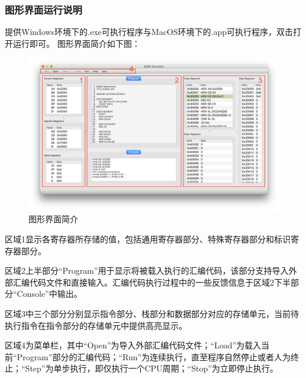 \documentclass[UTF8,12pt]{article}
\begin{document}
	    \subsubsection{图形界面运行说明}
	    提供Windows环境下的.exe可执行程序与MacOS环境下的.app可执行程序，双击打开运行即可。
	    图形界面简介如下图：\\
	    \begin{figure}[H]
    	    \centering
    	    \includegraphics[width=15cm]{fig/ui.png}
    	    \caption{图形界面简介}
    	    \label{图形界面简介}
	    \end{figure}
	    区域1显示各寄存器所存储的值，包括通用寄存器部分、特殊寄存器部分和标识寄存器部分。
	    
	    区域2上半部分“Program”用于显示将被载入执行的汇编代码，该部分支持导入外部汇编代码文件和直接输入。汇编代码执行过程中的一些反馈信息于区域2下半部分“Console”中输出。
	    
	    区域3中三个部分分别显示指令部分、栈部分和数据部分对应的存储单元，当前待执行指令在指令部分的存储单元中提供高亮显示。
	    
	    区域4为菜单栏，其中“Open”为导入外部汇编代码文件；“Load”为载入当前“Program”部分的汇编代码；“Run”为连续执行，直至程序自然停止或者人为终止；“Step”为单步执行，即仅执行一个CPU周期；“Stop”为立即停止执行。
	    
	    
\end{document}
